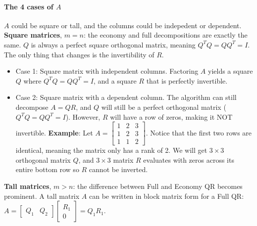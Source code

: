 \documentclass[../linear-algebra.tex]{subfiles}
\begin{document}
\paragraph{The 4 cases of $A$} $A$ could be square or tall, and the columns could be indepedent or dependent.\newline
\textbf{Square matrices}, $m=n$: the economy and full decompositions are exactly the same. $Q$ is always a perfect square orthogonal matrix, meaning $Q^T Q = Q Q^T = I$. The only thing that changes is the invertibility of $R$.
\begin{itemize}
    \item Case 1: Square matrix with independent columns.
    Factoring $A$ yields a square $Q$ where $Q^T Q = Q Q^T = I$, and a square $R$ that is perfectly invertible.
    \item Case 2: Square matrix with a dependent column.
    The algorithm can still decompose $A = QR$, and $Q$ will still be a perfect orthogonal matrix ($Q^T Q = Q Q^T = I$). However, $R$ will have a row of zeros, making it NOT invertible.\newline
    \textbf{Example}: Let $A = \begin{bmatrix} 1 & 2 & 3 \\ 1 & 2 & 3 \\ 1 & 1 & 2 \end{bmatrix}$. Notice that the first two rows are identical, meaning the matrix only has a rank of 2.
    We will get $3 \times 3$ orthogonal matrix $Q$, and $3 \times 3$ matrix $R$ evaluates with zeros across its entire bottom row so $R$ cannot be inverted.
\end{itemize}
\textbf{Tall matrices}, $m>n$: the difference between Full and Economy QR becomes prominent.\newline
A tall matrix $A$ can be written in block matrix form for a Full QR: $A = \begin{bmatrix} Q_1 & Q_2 \end{bmatrix} \begin{bmatrix} R_1 \\ 0 \end{bmatrix} = Q_1 R_1$.
\end{document}
